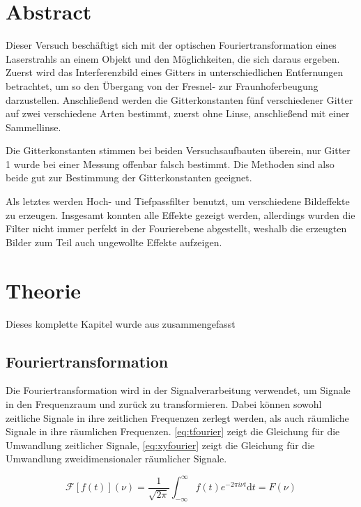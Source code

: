 \section{Abstract}
Dieser Versuch beschäftigt sich mit der optischen Fouriertransformation eines Laserstrahls an einem Objekt und den Möglichkeiten, die sich daraus ergeben. Zuerst wird das Interferenzbild eines Gitters in unterschiedlichen Entfernungen betrachtet, um so den Übergang von der Fresnel- zur Fraunhoferbeugung darzustellen. Anschließend werden die Gitterkonstanten fünf verschiedener Gitter auf zwei verschiedene Arten bestimmt, zuerst ohne Linse, anschließend mit einer Sammellinse.

Die Gitterkonstanten stimmen bei beiden Versuchsaufbauten überein, nur Gitter 1 wurde bei einer Messung offenbar falsch bestimmt. Die Methoden sind also beide gut zur Bestimmung der Gitterkonstanten geeignet.


Als letztes werden Hoch- und Tiefpassfilter benutzt, um verschiedene Bildeffekte zu erzeugen. Insgesamt konnten alle Effekte gezeigt werden, allerdings wurden die Filter nicht immer perfekt in der Fourierebene abgestellt, weshalb die erzeugten Bilder zum Teil auch ungewollte Effekte aufzeigen. 




\section{Theorie}
Dieses komplette Kapitel wurde aus \autocite{anleitung-ws2014} zusammengefasst
\subsection{Fouriertransformation}
Die Fouriertransformation wird in der Signalverarbeitung verwendet, um Signale in den Frequenzraum und zurück zu transformieren. Dabei können sowohl zeitliche Signale in ihre zeitlichen Frequenzen zerlegt werden, als auch räumliche Signale in ihre räumlichen Frequenzen. \cref{eq:tfourier} zeigt die Gleichung für die Umwandlung zeitlicher Signale, \cref{eq:xyfourier} zeigt die Gleichung für die Umwandlung zweidimensionaler räumlicher Signale.

\begin{equation}
	\mathcal{F}\left[ f\left( t\right) \right] \left( \nu\right) = \frac{1}{\sqrt{2\pi}} \int_{-\infty}^{\infty} f\left( t\right) e^{-2\pi i \nu t} \text{d}t = F\left( \nu\right) 
	\label{eq:tfourier}
\end{equation}

